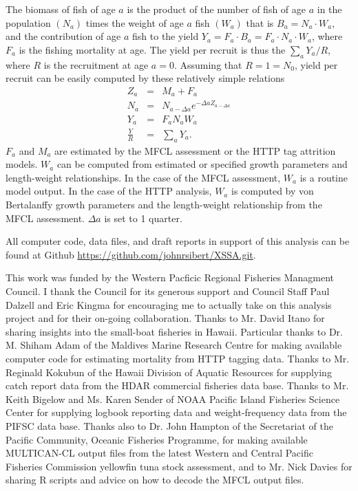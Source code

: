 \documentclass[12pt,letterpaper]{article}
\newcommand\singlespacing{\baselineskip=1.0\normalbaselineskip}
\begin{document}
The biomass of fish of age $a$ is the product of the number of fish
of age $a$ in the population $(N_a)$ times the weight of age $a$ fish
$(W_a)$ that is $B_a=N_a\cdot W_a$, and the contribution of age $a$
fish to the yield $Y_a=F_a\cdot B_a = F_a\cdot N_a\cdot W_a$, 
where $F_a$ is the fishing mortality at age.  
The yield per recruit is thus the $\sum_a Y_a/R$, where $R$ is the
recruitment at age $a=0$.
%
Assuming that $R = 1 = N_0$, yield per recruit can be easily computed by these
relatively simple relations
\begin{eqnarray}
Z_a &=& M_a +F_a \\
N_a &=& N_{a-\Delta a}e^{-\Delta aZ_{a-\Delta a}}\\
Y_a &=& F_aN_aW_a\\
\frac{Y}{R} &=& \sum_a Y_a.
\end{eqnarray}
$F_a$ and $M_a$ are estimated by the MFCL assessment or the HTTP
tag attrition models.
$W_a$ can be computed from estimated or specified
growth parameters and length-weight relationships. In the case of the
MFCL assessment, $W_a$ is a routine model output. In the case of the
HTTP analysis, $W_a$ is computed by von Bertalanffy growth parameters
and the length-weight relationship from the MFCL assessment.
$\Delta a$ is set to 1 quarter.

All computer code, data files, and draft reports in support of this
analysis can be found at Github
\url{https://github.com/johnrsibert/XSSA.git}.

\singlespacing
\vspace{4ex}
This work was funded by the Western Pacficic Regional Fisheries
Managment Council. I thank the Council for its generous support and
Council Staff Paul Dalzell and Eric Kingma for encouraging me to
actually take on this analysis project and for their on-going
collaboration.
Thanks to Mr. David Itano for sharing insights into the small-boat
fisheries in Hawaii.
Particular thanks to Dr. M. Shiham Adam of the Maldives Marine
Research Centre for making available computer code for estimating
mortality from HTTP tagging data.
Thanks to Mr. Reginald Kokubun of the Hawaii Division of Aquatic
Resources for supplying catch report data from the HDAR commercial
fisheries data base.
Thanks to Mr. Keith Bigelow and Ms. Karen Sender of NOAA Pacific
Island Fisheries Science Center for supplying logbook reporting data and
weight-frequency data from the PIFSC data base.
Thanks also to Dr. John Hampton of the Secretariat of the Pacific
Community, Oceanic Fisheries Programme, for making available
MULTICAN-CL output files from the latest Western and Central Pacific
Fisheries Commission yellowfin tuna stock assessment, and to Mr. Nick
Davies for sharing R scripts and advice on how to decode the MFCL
output files.
\end{document}
